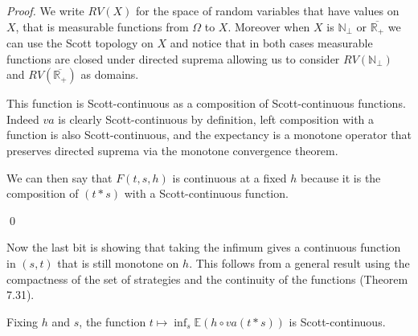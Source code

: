\begin{proof}
    We write $RV(X)$ for the space of random variables 
    that have values on $X$, that is measurable 
    functions from $\Omega$ to $X$. Moreover when 
    $X$ is $\mathbb{N}_\bot$ or $\overline{\mathbb{R}_+}$
    we can use the Scott topology on $X$ and notice that in both cases 
    measurable functions are closed under directed suprema 
    allowing us to consider $RV(\mathbb{N}_\bot)$ and $RV(\overline{\mathbb{R}_+})$ as 
    domains.

    \begin{center}
    \end{center}

    This function is Scott-continuous as a composition of 
    Scott-continuous functions. Indeed $va$ is clearly Scott-continuous 
    by definition, left composition with a function is also
    Scott-continuous, and the expectancy is a monotone operator 
    that preserves directed suprema via the monotone convergence theorem. 

    We can then say that $F(t,s,h)$ is continuous at a fixed $h$
    because it is the composition of $(t*s)$ with a Scott-continuous 
    function.

    \qed
\end{proof}

Now the last bit is showing that taking the infimum gives 
a continuous function in $(s,t)$ that is still monotone on $h$.
This follows from a general result using the compactness of the 
set of strategies and the continuity of the functions 
\cite{AndreaShalk} (Theorem 7.31).

\begin{alemma}
    \label{lem:mixedscottcontinuous}
    Fixing $h$ and $s$, 
    the function $t \mapsto \inf_s \mathbb{E} (h \circ va(t*s))$
    is Scott-continuous.
\end{alemma}

